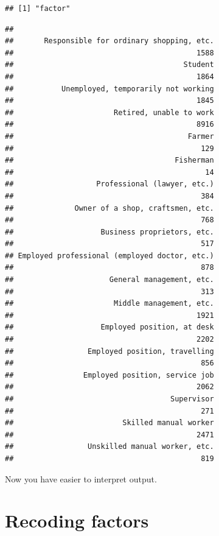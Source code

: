 \documentclass[
]{book}
\newenvironment{Shaded}{\begin{snugshade}}{\end{snugshade}}
\newcommand{\FunctionTok}[1]{\textcolor[rgb]{0.00,0.00,0.00}{#1}}
\newcommand{\NormalTok}[1]{#1}
\newcommand{\SpecialCharTok}[1]{\textcolor[rgb]{0.00,0.00,0.00}{#1}}
\begin{document}
\begin{verbatim}
## [1] "factor"
\end{verbatim}

\begin{Shaded}
\end{Shaded}

\begin{verbatim}
## 
##       Responsible for ordinary shopping, etc. 
##                                          1588 
##                                       Student 
##                                          1864 
##           Unemployed, temporarily not working 
##                                          1845 
##                       Retired, unable to work 
##                                          8916 
##                                        Farmer 
##                                           129 
##                                     Fisherman 
##                                            14 
##                   Professional (lawyer, etc.) 
##                                           384 
##              Owner of a shop, craftsmen, etc. 
##                                           768 
##                    Business proprietors, etc. 
##                                           517 
## Employed professional (employed doctor, etc.) 
##                                           878 
##                      General management, etc. 
##                                           313 
##                       Middle management, etc. 
##                                          1921 
##                    Employed position, at desk 
##                                          2202 
##                 Employed position, travelling 
##                                           856 
##                Employed position, service job 
##                                          2062 
##                                    Supervisor 
##                                           271 
##                         Skilled manual worker 
##                                          2471 
##                 Unskilled manual worker, etc. 
##                                           819
\end{verbatim}

Now you have easier to interpret output.

\hypertarget{recoding-factors}{%
\section{Recoding factors}\label{recoding-factors}}
\end{document}
